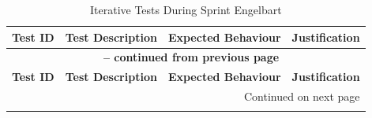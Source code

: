 \begin{longtable}{|p{}|p{}|p{}|p{}|}
	\caption{Iterative Tests During Sprint Engelbart} \label{tab:sprint_engelbart_tests_lt_rev} \\
	\hline
	\textbf{Test ID} & \textbf{Test Description} & \textbf{Expected Behaviour} & \textbf{Justification} \\
	\hline
	\endfirsthead
	\multicolumn{4}{c}{{\bfseries \tablename\ \thetable{} -- continued from previous page}} \\ \hline
	\textbf{Test ID} & \textbf{Test Description} & \textbf{Expected Behaviour} & \textbf{Justification} \\ \hline \endhead
	\hline \multicolumn{4}{r}{{Continued on next page}} \\ \endfoot \hline \endlastfoot
	

\end{longtable}
